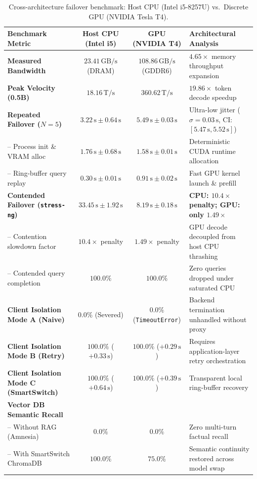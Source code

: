 \documentclass[11pt,a4paper]{article}
\newcommand{\Ts}{\,\mathrm{T/s}}
\newcommand{\GBs}{\,\mathrm{GB/s}}
\newcommand{\su}{\,\mathrm{s}}
\newcommand{\code}[1]{\texttt{#1}}
\begin{document}
\begin{table}[h]
\centering
\caption{Cross-architecture failover benchmark: Host CPU (Intel i5-8257U) vs.\ Discrete GPU (NVIDIA Tesla T4).}\label{tab:gpu_comparison}
\footnotesize
\begin{tabularx}{\linewidth}{@{}p{3.4cm}CCX@{}}
\toprule
\textbf{Benchmark Metric} & \textbf{Host CPU (Intel i5)} & \textbf{GPU (NVIDIA T4)} & \textbf{Architectural Analysis} \\
\midrule
\textbf{Measured Bandwidth} & $23.41\GBs$ (DRAM) & $\mathbf{108.86\GBs}$ (GDDR6) & $4.65\times$ memory throughput expansion \\
\textbf{Peak Velocity (0.5B)} & $18.16\Ts$ & $\mathbf{360.62\Ts}$ & $19.86\times$ token decode speedup \\
\midrule
\textbf{Repeated Failover ($N=5$)} & $3.22\su \pm 0.64\su$ & $5.49\su \pm 0.03\su$ & Ultra-low jitter ($\sigma = 0.03\su$, CI: $[5.47\su, 5.52\su]$) \\
\quad -- Process init \& VRAM alloc & $1.76\su \pm 0.68\su$ & $1.58\su \pm 0.01\su$ & Deterministic CUDA runtime allocation \\
\quad -- Ring-buffer query replay & $0.30\su \pm 0.01\su$ & $0.91\su \pm 0.02\su$ & Fast GPU kernel launch \& prefill \\
\midrule
\textbf{Contended Failover (\code{stress-ng})} & $33.45\su \pm 1.92\su$ & $\mathbf{8.19\su \pm 0.18\su}$ & \textbf{CPU: $10.4\times$ penalty; GPU: only $1.49\times$} \\
\quad -- Contention slowdown factor & $10.4\times$ penalty & $\mathbf{1.49\times}$ penalty & GPU decode decoupled from host CPU thrashing \\
\quad -- Contended query completion & $\mathbf{100.0\%}$ & $\mathbf{100.0\%}$ & Zero queries dropped under saturated CPU \\
\midrule
\textbf{Client Isolation Mode A (Naive)} & $0.0\%$ (Severed) & $0.0\%$ (\code{TimeoutError}) & Backend termination unhandled without proxy \\
\textbf{Client Isolation Mode B (Retry)} & $100.0\%$ ($+0.33\su$) & $100.0\%$ ($+0.29\su$) & Requires application-layer retry orchestration \\
\textbf{Client Isolation Mode C (SmartSwitch)} & $\mathbf{100.0\%}$ ($+0.64\su$) & $\mathbf{100.0\%}$ ($+0.39\su$) & Transparent local ring-buffer recovery \\
\midrule
\textbf{Vector DB Semantic Recall} & & & \\
\quad -- Without RAG (Amnesia) & $0.0\%$ & $0.0\%$ & Zero multi-turn factual recall \\
\quad -- With SmartSwitch ChromaDB & $\mathbf{100.0\%}$ & $\mathbf{75.0\%}$ & Semantic continuity restored across model swap \\
\bottomrule
\end{tabularx}
\end{table}
\end{document}
